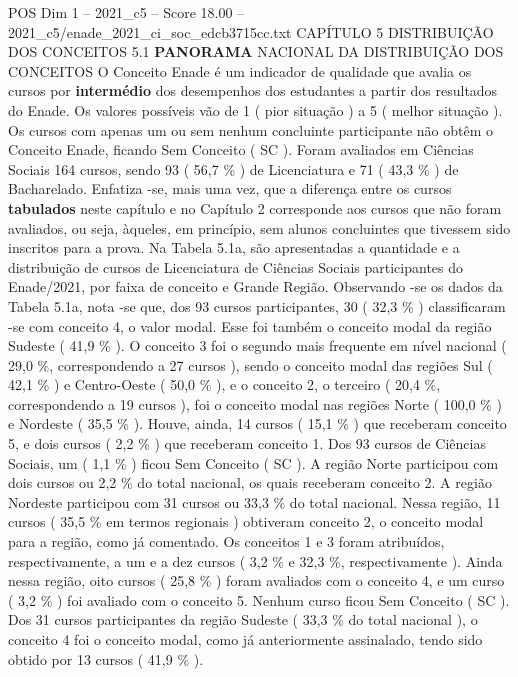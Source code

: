 \begin{textsample}{POS Dim 1 – 2021\_c5 – Score 18.00 – 2021\_c5/enade\_2021\_ci\_soc\_edcb3715cc.txt}  \label{ex:f1_pos_034}
CAPÍTULO 5 DISTRIBUIÇÃO DOS CONCEITOS 5.1 \textbf{PANORAMA} NACIONAL DA DISTRIBUIÇÃO DOS CONCEITOS O Conceito Enade é um indicador de qualidade que avalia os cursos por \textbf{intermédio} dos desempenhos dos estudantes a partir dos resultados do Enade.
Os valores possíveis vão de 1 ( pior situação ) a 5 ( melhor situação ).
Os cursos com apenas um ou sem nenhum concluinte participante não obtêm o Conceito Enade, ficando Sem Conceito ( SC ).
Foram avaliados em Ciências Sociais 164 cursos, sendo 93 ( 56,7 \% ) de Licenciatura e 71 ( 43,3 \% ) de Bacharelado.
Enfatiza -se, mais uma vez, que a diferença entre os cursos \textbf{tabulados} neste capítulo e no Capítulo 2 corresponde aos cursos que não foram avaliados, ou seja, àqueles, em princípio, sem alunos concluintes que tivessem sido inscritos para a prova.
Na Tabela 5.1a, são apresentadas a quantidade e a distribuição de cursos de Licenciatura de Ciências Sociais participantes do Enade/2021, por faixa de conceito e Grande Região.
Observando -se os dados da Tabela 5.1a, nota -se que, dos 93 cursos participantes, 30 ( 32,3 \% ) classificaram -se com conceito 4, o valor modal.
Esse foi também o conceito modal da região Sudeste ( 41,9 \% ).
O conceito 3 foi o segundo mais frequente em nível nacional ( 29,0 \%, correspondendo a 27 cursos ), sendo o conceito modal das regiões Sul ( 42,1 \% ) e Centro-Oeste ( 50,0 \% ), e o conceito 2, o terceiro ( 20,4 \%, correspondendo a 19 cursos ), foi o conceito modal nas regiões Norte ( 100,0 \% ) e Nordeste ( 35,5 \% ).
Houve, ainda, 14 cursos ( 15,1 \% ) que receberam conceito 5, e dois cursos ( 2,2 \% ) que receberam conceito 1.
Dos 93 cursos de Ciências Sociais, um ( 1,1 \% ) ficou Sem Conceito ( SC ).
A região Norte participou com dois cursos ou 2,2 \% do total nacional, os quais receberam conceito 2.
A região Nordeste participou com 31 cursos ou 33,3 \% do total nacional.
Nessa região, 11 cursos ( 35,5 \% em termos regionais ) obtiveram conceito 2, o conceito modal para a região, como já comentado.
Os conceitos 1 e 3 foram atribuídos, respectivamente, a um e a dez cursos ( 3,2 \% e 32,3 \%, respectivamente ).
Ainda nessa região, oito cursos ( 25,8 \% ) foram avaliados com o conceito 4, e um curso ( 3,2 \% ) foi avaliado com o conceito 5.
Nenhum curso ficou Sem Conceito ( SC ).
Dos 31 cursos participantes da região Sudeste ( 33,3 \% do total nacional ), o conceito 4 foi o conceito modal, como já anteriormente assinalado, tendo sido obtido por 13 cursos ( 41,9 \% ).

\end{textsample}
